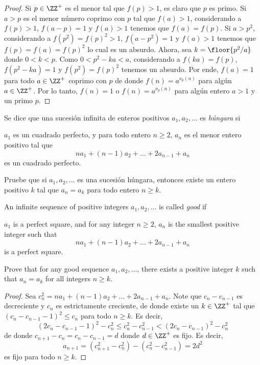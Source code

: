 \begin{proof}
  Si $p\in\ZZ^+$ es el menor tal que $f(p)>1$, es claro que $p$ es primo. Si
  $a>p$ es el menor número coprimo con $p$ tal que $f(a)>1$, considerando a
  $f(p)>1$, $f(a-p)=1$ y $f(a)>1$ tenemos que $f(a)=f(p)$. Si $a>p^2$,
  considerando a $f(p^2)=f(p)^2>1$, $f(a-p^2)=1$ y $f(a)>1$ tenemos que
  $f(p)=f(a)=f(p)^2$ lo cual es un absurdo. Ahora, sea $k=\floor{p^2/a}$ donde
  $0<k<p$. Como $0<p^2-ka<a$, considerando a $f(ka)=f(p)$, $f(p^2-ka)=1$ y
  $f(p^2)=f(p)^2$ tenemos un absurdo. Por ende, $f(a)=1$ para todo $a\in\ZZ^+$
  coprimo con $p$ de donde $f(n)=a^{\nu_p(n)}$ para algún $a\in\ZZ^+$. Por lo
  tanto, $f(n)=1$ o $f(n)=a^{\nu_p(n)}$ para algún entero $a>1$ y un primo $p$.
\end{proof}

\begin{probEG}[EGMO 2022/3]
  Se dice que una sucesión infinita de enteros positivos $a_1,a_2,\dots$ es
  \emph{húngara} si
  \begin{enumerate}[(1)]
    \ii $a_1$ es un cuadrado perfecto, y
    \ii para todo entero $n\ge 2$, $a_n$ es el menor entero positivo tal que
    \[na_1+(n-1)a_2+\dots+2a_{n-1}+a_n\]
    es un cuadrado perfecto.
  \end{enumerate}
  Pruebe que si $a_1,a_2,\dots$ es una sucesión húngara, entonces existe un
  entero positivo $k$ tal que $a_n=a_k$ para todo entero $n\ge k$.
  \begin{hint}
    An infinite sequence of positive integers $a_1,a_2,\dots$ is called
    \emph{good} if
    \begin{enumerate}[(1)]
      \ii $a_1$ is a perfect square, and
      \ii for any integer $n\ge 2$, $a_n$ is the smallest positive integer such
      that
      \[na_1+(n-1)a_2+\dots+2a_{n-1}+a_n\]
      is a perfect square.
    \end{enumerate}
    Prove that for any good sequence $a_1,a_2,\dots$, there exists a positive
    integer $k$ such that $a_n=a_k$ for all integers $n\ge k$.
  \end{hint}
\end{probEG}

\begin{proof}
  Sea $c_n^2=na_1+(n-1)a_2+\dots+2a_{n-1}+a_n$. Note que $c_n-c_{n-1}$ es
  decreciente y $c_n$ es estrictamente creciente, de donde existe un $k\in\ZZ^+$
  tal que $(c_n-c_{n-1}-1)^2\le c_n$ para todo $n\ge k$. Es decir,
  \[(2c_n-c_{n-1}-1)^2-c_n^2\le c_n^2-c_{n-1}^2<(2c_n-c_{n-1})^2-c_n^2\]
  de donde $c_{n+1}-c_n=c_n-c_{n-1}=d$ donde $d\in\ZZ^+$ es fijo. Es decir,
  \[a_{n+1}=(c_{n+1}^2-c_n^2)-(c_n^2-c_{n-1}^2)=2d^2\]
  es fijo para todo $n\ge k$.
\end{proof}

